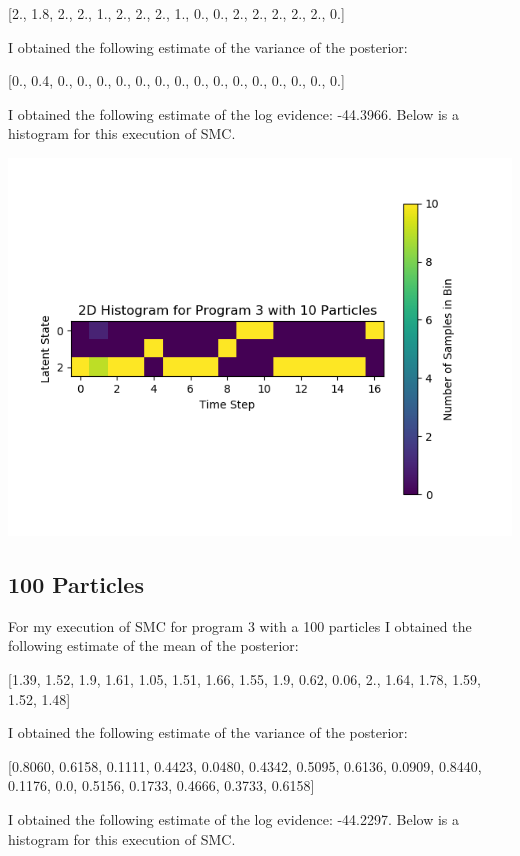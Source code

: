 \documentclass[11pt]{article}
\theoremstyle{definition}
\begin{document}
[2., 1.8, 2., 2., 1., 2., 2., 2., 1., 0., 0., 2., 2., 2., 2., 2., 0.]

I obtained the following estimate of the variance of the posterior:

[0., 0.4, 0., 0., 0., 0., 0., 0., 0., 0., 0., 0., 0., 0., 0., 0., 0.]

I obtained the following estimate of the log evidence: -44.3966. Below is a histogram for this execution of SMC.

\begin{center}
\includegraphics[scale=0.5]{../plots/P3NP10.png}
\end{center}

\subsection{100 Particles}

For my execution of SMC for program 3 with a 100 particles I obtained the following estimate of the mean of the posterior:

[1.39, 1.52, 1.9, 1.61, 1.05, 1.51, 1.66, 1.55, 1.9, 0.62, 0.06, 2., 1.64, 1.78, 1.59, 1.52, 1.48]

I obtained the following estimate of the variance of the posterior:

[0.8060, 0.6158, 0.1111, 0.4423, 0.0480, 0.4342, 0.5095, 0.6136, 0.0909, 0.8440, 0.1176, 0.0, 0.5156, 0.1733, 0.4666, 0.3733, 0.6158]

I obtained the following estimate of the log evidence: -44.2297. Below is a histogram for this execution of SMC.
\end{document}
